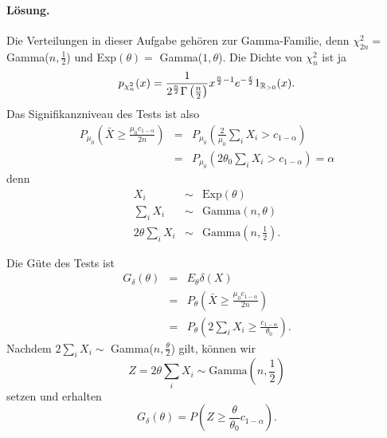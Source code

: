 \paragraph*{Lösung. } Die Verteilungen in dieser Aufgabe gehören zur Gamma-Familie, denn
$\chi^2_{2n}=$ Gamma($n,\frac{1}{2}$) und Exp$(\theta) =$ Gamma($1,\theta$). Die Dichte von $\chi^2_n$ ist ja 
\begin{equation}
    p_{\chi^2_n} (x) = 
    \frac{1}{2^{\frac{n}{2}} \Gamma\left( \frac{n}{2} \right)} x^{ \frac{n}{2} -1}e^{-\frac{x}{2}} 1_{\mathbb R_{>0}}(x).
\end{equation}
Das Signifikanzniveau des Tests ist also
\begin{eqnarray}
    P_{\mu_0} \left( \bar X \geq \frac{ \mu_0 c_{1-\alpha} }{2n} \right)  
    &=& P_{\mu_0} \left( \frac{2}{\mu_0} \sum_{i}^{} X_i  > c_{1-\alpha}   \right) \\
    &=& P_{\mu_0} \left( 2 \theta_0 \sum_{i}^{} X_i > c_{1-\alpha} \right) = \alpha
\end{eqnarray}
denn 
\begin{eqnarray}
    X_i & \sim & \textrm{Exp}(\theta) \\
    \sum_{i}^{} X_i & \sim & \textrm{Gamma}(n,\theta) \\
    2\theta \sum_{i}^{} X_i & \sim & \textrm{Gamma}(n,\frac{1}{2}).
\end{eqnarray}

Die Güte des Tests ist
\begin{eqnarray}
    G_\delta (\theta) &=&  E_\theta \delta(X) \\
    &=& P_\theta \left( \bar X  \geq \frac{\mu_0 c_{1-\alpha}}{2n} \right) \\
    &=& P_\theta \left( 2 \sum_{i}^{} X_i \geq \frac{c_{1-\alpha}}{\theta_0} \right).
\end{eqnarray}
Nachdem $2 \sum_{i} X_i \sim $ Gamma($n, \frac{\theta}{2}$) gilt, können wir 
\begin{equation}
    Z = 2 \theta \sum_{i}^{} X_i \sim \textrm{Gamma}(n,\frac{1}{2})
\end{equation}
setzen und erhalten
\begin{equation}
    G_\delta(\theta) = P \left( Z \geq \frac{\theta}{\theta_0} c_{1-\alpha} \right).
\end{equation}

